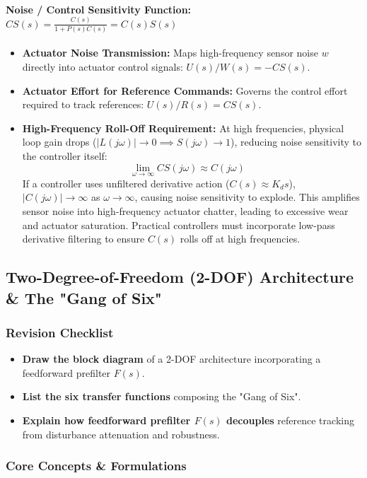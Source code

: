 \documentclass[12pt,onecolumn,twoside ]{article}
\begin{document}
	\paragraph{Noise / Control Sensitivity Function: $CS(s) = \frac{C(s)}{1 + P(s)C(s)} = C(s)S(s)$}
	\begin{itemize}
		\item
		\textbf{Actuator Noise Transmission:} Maps high-frequency sensor noise $w$ directly into actuator control signals: $U(s)/W(s) = -CS(s)$.
		\item
		\textbf{Actuator Effort for Reference Commands:} Governs the control effort required to track references: $U(s)/R(s) = CS(s)$.
		\item
		\textbf{High-Frequency Roll-Off Requirement:} At high frequencies, physical loop gain drops ($|L(j\omega)| \to 0 \implies S(j\omega) \to 1$), reducing noise sensitivity to the controller itself: \[
		\lim_{\omega \to \infty} CS(j\omega) \approx C(j\omega) \quad
		\] If a controller uses unfiltered derivative action ($C(s) \approx K_d s$), $|C(j\omega)| \to \infty$ as $\omega \to \infty$, causing noise sensitivity to explode. This amplifies sensor noise into high-frequency actuator chatter, leading to excessive wear and actuator saturation. Practical controllers must incorporate low-pass derivative filtering to ensure $C(s)$ rolls off at high frequencies.
	\end{itemize}
	
	\subsection{Two-Degree-of-Freedom (2-DOF) Architecture \& The "Gang of Six"}
	\subsubsection{Revision Checklist}
	\begin{itemize}
		\item[$\square$]
		\textbf{Draw the block diagram} of a 2-DOF architecture incorporating a feedforward prefilter $F(s)$.
		\item[$\square$]
		\textbf{List the six transfer functions} composing the "Gang of Six".
		\item[$\square$]
		\textbf{Explain how feedforward prefilter $F(s)$ decouples} reference tracking from disturbance attenuation and robustness.
	\end{itemize}
	
	\subsubsection{Core Concepts \& Formulations}
\end{document}
